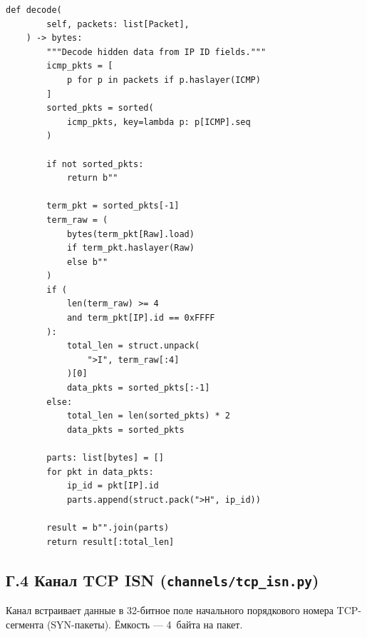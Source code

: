 \begin{lstlisting}[style=appendixcode]
    def decode(
        self, packets: list[Packet],
    ) -> bytes:
        """Decode hidden data from IP ID fields."""
        icmp_pkts = [
            p for p in packets if p.haslayer(ICMP)
        ]
        sorted_pkts = sorted(
            icmp_pkts, key=lambda p: p[ICMP].seq
        )

        if not sorted_pkts:
            return b""

        term_pkt = sorted_pkts[-1]
        term_raw = (
            bytes(term_pkt[Raw].load)
            if term_pkt.haslayer(Raw)
            else b""
        )
        if (
            len(term_raw) >= 4
            and term_pkt[IP].id == 0xFFFF
        ):
            total_len = struct.unpack(
                ">I", term_raw[:4]
            )[0]
            data_pkts = sorted_pkts[:-1]
        else:
            total_len = len(sorted_pkts) * 2
            data_pkts = sorted_pkts

        parts: list[bytes] = []
        for pkt in data_pkts:
            ip_id = pkt[IP].id
            parts.append(struct.pack(">H", ip_id))

        result = b"".join(parts)
        return result[:total_len]
\end{lstlisting}

\newpage
\subsection*{Г.4 Канал TCP ISN (\texttt{channels/tcp\_isn.py})}

Канал встраивает данные в 32-битное поле начального порядкового номера
TCP-сегмента (SYN-пакеты). Ёмкость --- 4~байта на пакет.

